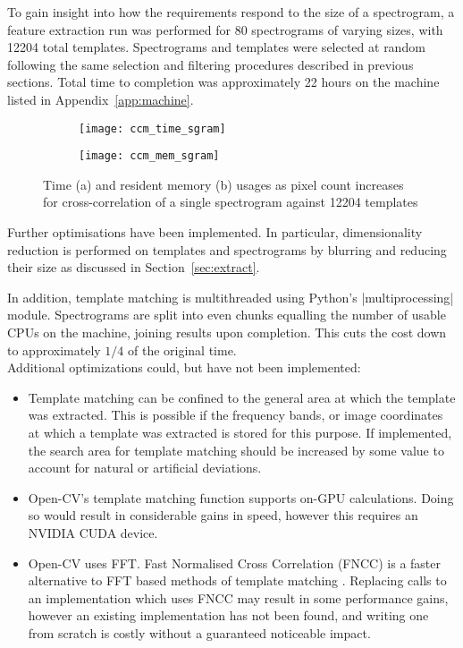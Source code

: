 To gain insight into how the requirements respond to the size of a
spectrogram, a feature extraction run was performed for 80 spectrograms of
varying sizes, with 12204 total templates.
Spectrograms and templates were selected at random following the same selection
and filtering procedures described in previous sections.
Total time to completion was approximately 22 hours on the machine listed in
Appendix~\ref{app:machine}.\\

\begin{figure}[!htb]
  \centering
  \begin{subfigure}[b]{0.5\textwidth}
    \centering
    \texttt{[image: ccm\_time\_sgram]}
    \caption{}
  \end{subfigure}%
  \begin{subfigure}[b]{0.5\textwidth}
    \centering
    \texttt{[image: ccm\_mem\_sgram]}
    \caption{}
  \end{subfigure}
  \caption{Time (a) and resident memory (b) usages as pixel count increases for
  cross-correlation of a single spectrogram against 12204 templates}
\end{figure}

Further optimisations have been implemented.
In particular, dimensionality reduction is performed on templates and
spectrograms by blurring and reducing their size as discussed in
Section~\ref{sec:extract}.

In addition, template matching is multithreaded using Python's |multiprocessing|
module.
Spectrograms are split into even chunks equalling the number of usable CPUs on
the machine, joining results upon completion.
This cuts the cost down to approximately $1/4$ of the original time.\\

Additional optimizations could, but have not been implemented:
\begin{itemize}[noitemsep]
  \item Template matching can be confined to the general area at which the template
    was extracted.
    This is possible if the frequency bands, or image coordinates at which a
    template was extracted is stored for this purpose.
    If implemented, the search area for template matching should be increased by some
    value to account for natural or artificial deviations.

  \item Open-CV's template matching function supports on-GPU calculations.
    Doing so would result in considerable gains in speed, however this requires
    an NVIDIA CUDA device.

  \item Open-CV uses FFT.
    Fast Normalised Cross Correlation (FNCC) is a faster alternative to FFT based
    methods of template matching \parencite{briechle2001}.
    Replacing calls to an implementation which uses FNCC may result in some 
    performance gains, however an existing implementation has not been found,
    and writing one from scratch is costly without a guaranteed noticeable
    impact.
\end{itemize}

